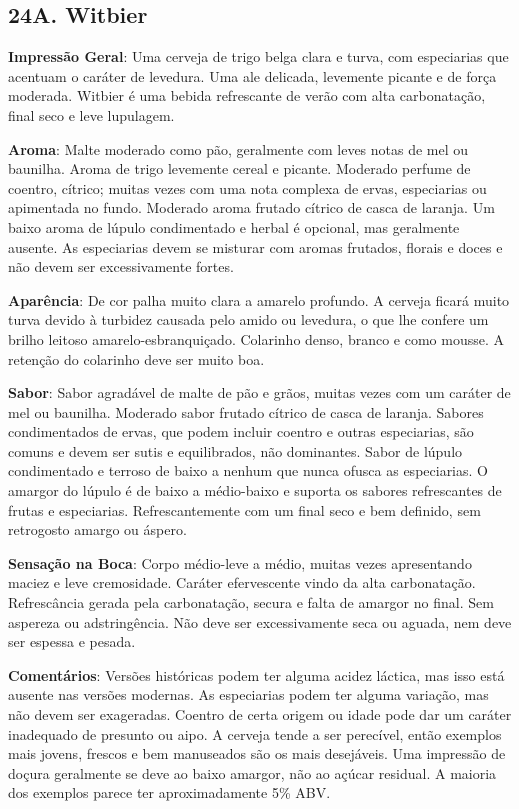 \subsection*{24A. Witbier}
\textbf{Impressão Geral}: Uma cerveja de trigo belga clara e turva, com especiarias que acentuam o caráter de levedura. Uma ale delicada, levemente picante e de força moderada. Witbier é uma bebida refrescante de verão com alta carbonatação, final seco e leve lupulagem.

\textbf{Aroma}: Malte moderado como pão, geralmente com leves notas de mel ou baunilha. Aroma de trigo levemente cereal e picante. Moderado perfume de coentro, cítrico; muitas vezes com uma nota complexa de ervas, especiarias ou apimentada no fundo. Moderado aroma frutado cítrico de casca de laranja. Um baixo aroma de lúpulo condimentado e herbal é opcional, mas geralmente ausente. As especiarias devem se misturar com aromas frutados, florais e doces e não devem ser excessivamente fortes.

\textbf{Aparência}: De cor palha muito clara a amarelo profundo. A cerveja ficará muito turva devido à turbidez causada pelo amido ou levedura, o que lhe confere um brilho leitoso amarelo-esbranquiçado. Colarinho denso, branco e como mousse. A retenção do colarinho deve ser muito boa.

\textbf{Sabor}: Sabor agradável de malte de pão e grãos, muitas vezes com um caráter de mel ou baunilha. Moderado sabor frutado cítrico de casca de laranja. Sabores condimentados de ervas, que podem incluir coentro e outras especiarias, são comuns e devem ser sutis e equilibrados, não dominantes. Sabor de lúpulo condimentado e terroso de baixo a nenhum que nunca ofusca as especiarias. O amargor do lúpulo é de baixo a médio-baixo e suporta os sabores refrescantes de frutas e especiarias. Refrescantemente com um final seco e bem definido, sem retrogosto amargo ou áspero.

\textbf{Sensação na Boca}: Corpo médio-leve a médio, muitas vezes apresentando maciez e leve cremosidade. Caráter efervescente vindo da alta carbonatação. Refrescância gerada pela carbonatação, secura e falta de amargor no final. Sem aspereza ou adstringência. Não deve ser excessivamente seca ou aguada, nem deve ser espessa e pesada.

\textbf{Comentários}: Versões históricas podem ter alguma acidez láctica, mas isso está ausente nas versões modernas. As especiarias podem ter alguma variação, mas não devem ser exageradas. Coentro de certa origem ou idade pode dar um caráter inadequado de presunto ou aipo. A cerveja tende a ser perecível, então exemplos mais jovens, frescos e bem manuseados são os mais desejáveis. Uma impressão de doçura geralmente se deve ao baixo amargor, não ao açúcar residual. A maioria dos exemplos parece ter aproximadamente 5\% ABV.

